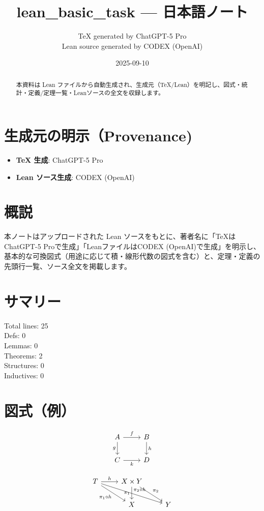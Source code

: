 \documentclass[12pt]{article}
\title{lean\_basic\_task — 日本語ノート}
\author{TeX generated by ChatGPT-5 Pro\\Lean source generated by CODEX (OpenAI)}
\date{2025-09-10}
\theoremstyle{definition}
\begin{document}
\maketitle

\begin{abstract}
本資料は Lean ファイルから自動生成され、生成元（TeX/Lean）を明記し、図式・統計・定義/定理一覧・Leanソースの全文を収録します。
\end{abstract}

\section*{生成元の明示（Provenance)}
\begin{itemize}
  \item \textbf{TeX 生成}: ChatGPT-5 Pro
  \item \textbf{Lean ソース生成}: CODEX (OpenAI)
\end{itemize}

\section*{概説}
本ノートはアップロードされた Lean ソースをもとに、著者名に「TeXはChatGPT-5 Proで生成」「LeanファイルはCODEX (OpenAI)で生成」を明示し、
基本的な可換図式（用途に応じて積・線形代数の図式を含む）と、定理・定義の先頭行一覧、ソース全文を掲載します。

\section*{サマリー}
Total lines: 25\\
Defs: 0\\
Lemmas: 0\\
Theorems: 2\\
Structures: 0\\
Inductives: 0

\section*{図式（例）}

\[
\begin{tikzcd}
A \arrow[r, "f"] \arrow[d, "g"'] & B \arrow[d, "h"] \\
C \arrow[r, "k"'] & D
\end{tikzcd}
\]



\[
\begin{tikzcd}
T \arrow[r, "h"] \arrow[dr, swap, "\pi_1\circ h"] \arrow[drr, "\pi_2\circ h"] & X\times Y \arrow[d, swap, "\pi_1"] \arrow[dr, "\pi_2"] \\
& X & Y
\end{tikzcd}
\]
\end{document}
